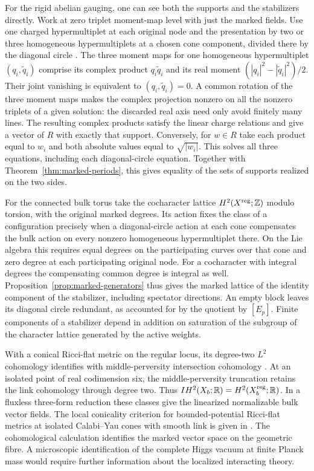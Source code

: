 For the rigid abelian gauging, one can see both the supports and
the stabilizers directly. Work at zero triplet moment-map level with
just the marked fields. Use one charged hypermultiplet at each
original node and the presentation by two or three homogeneous
hypermultiplets at a chosen cone component, divided there by the
diagonal circle \cite[\S\S2--3]{Higgs}. The three moment maps for
one homogeneous hypermultiplet $(q_i,\widetilde q_i)$ comprise its
complex product $q_i\widetilde q_i$ and its real moment
$(|q_i|^2-|\widetilde q_i|^2)/2$. Their joint vanishing is equivalent
to $(q_i,\widetilde q_i)=0$. A common rotation of the three moment
maps makes the complex projection nonzero on all the nonzero
triplets of a given solution: the discarded real axis need only
avoid finitely many lines. The resulting complex products satisfy
the linear charge relations and give a vector of $R$ with exactly
that support. Conversely, for $w\in R$ take each product equal to
$w_i$ and both absolute values equal to $\sqrt{|w_i|}$. This solves
all three equations, including each diagonal-circle equation.
Together with Theorem~\ref{thm:marked-periods}, this gives equality
of the sets of supports realized on the two sides.

For the connected bulk torus take the cocharacter lattice
$H^2(X^{\rm reg};\mathbb Z)$ modulo torsion, with the original marked
degrees. Its action fixes the class of a configuration precisely
when a diagonal-circle action at each cone compensates the bulk
action on every nonzero homogeneous hypermultiplet there. On the
Lie algebra this requires equal degrees on the participating curves
over that cone and zero degree at each participating original node.
For a cocharacter with integral degrees the compensating common
degree is integral as well. Proposition~\ref{prop:marked-generators}
thus gives the marked lattice of the identity component of the
stabilizer, including spectator directions. An empty block leaves
its diagonal circle redundant, as accounted for by the quotient
by $[E_p]$. Finite components of a stabilizer depend in addition
on saturation of the subgroup of the character lattice generated
by the active weights.

With a conical Ricci-flat metric on the regular locus, its
degree-two $L^2$ cohomology identifies with middle-perversity
intersection cohomology \cite{Cheeger}. At an isolated point of
real codimension six, the middle-perversity truncation retains
the link cohomology through degree two. Thus
$IH^2(X_b;\mathbb R)=H^2(X_b^{\rm reg};\mathbb R)$. In a fluxless
three-form reduction these classes give the linearized normalizable
bulk vector fields. The local conicality criterion for bounded-potential
Ricci-flat metrics at isolated Calabi--Yau cones with smooth link is
given in \cite[Theorem~1.4]{Zhang}. The cohomological calculation
identifies the marked vector space on the geometric fibre. A
microscopic identification of the complete Higgs vacuum at finite
Planck mass would require further information about the localized
interacting theory.

